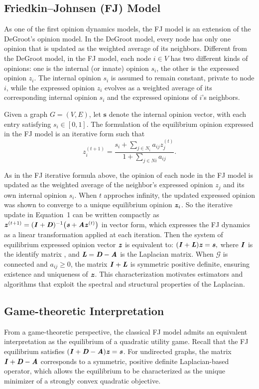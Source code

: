 \subsection{Friedkin--Johnsen (FJ) Model}\label{sec:FJ}
As one of the first opinion dynamics models, the FJ model is an extension of the DeGroot's opinion model. In the DeGroot
model, every node has only one opinion that is updated as the weighted
average of its neighbors. Different from the DeGroot model, in the FJ
model, each node $i \in V$ has two different kinds of opinions: one is
the internal (or innate) opinion $s_i$, the other is the expressed
opinion $z_i$. The internal opinion $s_i$ is assumed to remain constant,
private to node $i$, while the expressed opinion $z_i$ evolves as a
weighted average of its corresponding internal opinion $s_i$ and the
expressed opinions of $i$'s neighbors. 


Given a graph $G=(V,E)$, let $\mathbf{s}$ denote the internal opinion vector, with each entry satisfying $s_i\in[0,1]$.
The formulation of the equilibrium opinion expressed in the FJ model is an iterative form such that
\begin{equation}
z^{(t+1)}_{i}=\frac{s_{i}+\sum_{j\in N_{i}}a_{ij}z^{(t)}_{j}}{1+\sum_{j\in N{i}}a_{ij}}.
\label{fj-iteration}
\end{equation}

As in the FJ iterative formula above, the opinion of each node in the FJ model is updated as the weighted average of the neighbor's expressed opinion $z_j$ and its own internal opinion $s_i$. 
When $t$ approches infinity, the updated expressed opinion was shown to converge to a unique equilibrium opinion $\boldsymbol{\mathit{z}}_i$. So the iterative update in Equation~1 can be written compactly as 
\(
{\boldsymbol{\mathit{z}}}^{(t+1)} = (\boldsymbol{\mathit{I}}+\boldsymbol{\mathit{D}})^{-1}\bigl(\boldsymbol{\mathit{s}} + \boldsymbol{\mathit{A}}\boldsymbol{\mathit{z}}^{(t)}\bigr)
\)
in vector form,
which expresses the FJ dynamics as a linear transformation applied at each iteration.
Then the system of equilibrium
expressed opinion vector $\boldsymbol{\mathit{z}}$ is equivalent to:
$(\boldsymbol{\mathit{I}}+\boldsymbol{\mathit{L}})\boldsymbol{\mathit{z}}=\boldsymbol{\mathit{s}},$
where $\boldsymbol{\mathit{I}}$ is the identify matrix , and $\boldsymbol{\mathit{L}}=\boldsymbol{\mathit{D}}-\boldsymbol{\mathit{A}}$ is the Laplacian matrix. When $\mathcal{G}$ is connected and $a_{ij}\ge 0$, the matrix $\boldsymbol{\mathit{I}}+\boldsymbol{\mathit{L}}$ is symmetric positive definite, ensuring existence and uniqueness of $\boldsymbol{\mathit{z}}$. 
This characterization motivates estimators and algorithms that exploit the spectral and structural properties of the Laplacian. 

\subsection{Game-theoretic Interpretation}
From a game-theoretic perspective, the classical FJ model admits an equivalent interpretation as the equilibrium of a quadratic utility game.
Recall that the FJ equilibrium satisfies 
$(\boldsymbol{\mathit{I}}+\boldsymbol{\mathit{D}}-\boldsymbol{\mathit{A}})\boldsymbol{\mathit{z}}=\boldsymbol{\mathit{s}}$.
For undirected graphs, the matrix $\boldsymbol{\mathit{I}}+\boldsymbol{\mathit{D}}-\boldsymbol{\mathit{A}}$ corresponds to a symmetric, positive definite Laplacian-based operator, which allows the equilibrium to be characterized as the unique minimizer of a strongly convex quadratic objective.

